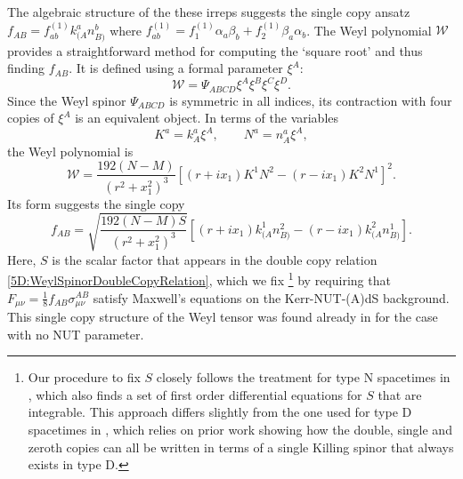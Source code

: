 The algebraic structure of the these irreps suggests the single copy ansatz $f_{AB} =
f^{(1)}_{ab} k^{a}_{(A} n^{b}_{B)}$ where $f^{(1)}_{ab} = f^{(1)}_{1} \alpha_{a} \beta_{b}
+ f^{(1)}_{2} \beta_{a} \alpha_{b}$. The Weyl polynomial $\mathcal{W}$ provides a straightforward method for computing the `square root' and thus finding $f_{AB}$.  It is defined using a formal parameter $\xi^A$:
%
\begin{equation} \label{5D:WeylPolynomialDefinition} 
    \mathcal{W} = \Psi_{ABCD} \xi^{A} \xi^{B} \xi^{C} \xi^{D}.
\end{equation}
%
Since the Weyl spinor $\Psi_{ABCD}$ is symmetric in all indices, its contraction with four
copies of $\xi^{A}$ is an equivalent object. In terms of the variables
%
\begin{equation} 
    K^{a} = k^{a}_{A} \xi^{A}, \qquad N^{a} = n^{a}_{A} \xi^{A},
\end{equation}
%
the Weyl polynomial is
%
\begin{equation} 
    \mathcal{W} =  \frac{192(N-M)}{(r^{2} + x_{1}^{2})^{3}} \left[ (r + i x_{1}) K^{1} N^{2}
    - (r - i x_{1}) K^{2} N^{1}\right]^{2}.
\end{equation}
%
Its form suggests the single copy 
%
\begin{equation} 
    f_{AB} = \sqrt{ \frac{192(N-M) S}{(r^{2} + x_{1}^{2})^{3}}} \left[ (r + i
    x_{1}) k^{1}_{(A} n^{2}_{B)} - (r - i x_{1}) k^{2}_{(A} n^{1}_{B)}\right].
\end{equation}
%
Here, $S$ is the scalar factor that appears in the double copy relation
\eqref{5D:WeylSpinorDoubleCopyRelation}, which we fix%
%
\footnote{Our procedure to fix $S$ closely follows the treatment for type N spacetimes in \cite{Godazgar:2020zbv},
which also finds a set of first order differential equations for $S$ that are integrable. This approach differs
slightly from the one used for type D spacetimes in \cite{Luna:2018dpt}, which relies on prior work showing how the
double, single and zeroth copies can all be written in terms of a single Killing spinor that always exists in type D.}
%
by requiring that $F_{\mu \nu} =
\frac{1}{8} f_{AB} \sigma^{AB}_{\mu \nu}$ satisfy Maxwell's equations on the
Kerr-NUT-(A)dS background. This single copy structure of the Weyl tensor was found already in
\cite{Didenko:2011ir} for the case with no NUT parameter.  

